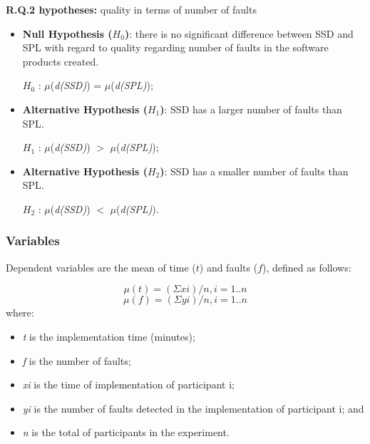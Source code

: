 \textbf{R.Q.2 hypotheses:}
quality in terms of number of faults
	\begin{itemize}
	
	\item \textbf{Null Hypothesis ($H_{0}$)}: there is no significant difference between SSD and SPL with regard to quality regarding number of faults in the software products created.
	
	$H_{0}$ : $\mu$(\textit{d(SSD)}) =  $\mu$(\textit{d(SPL)});
	
	\item \textbf{Alternative Hypothesis ($H_{1}$)}: SSD has a larger number of faults than SPL.
	
	$H_{1}$ : $\mu$(\textit{d(SSD)}) $>$ $\mu$(\textit{d(SPL)});
		
	\item \textbf{Alternative Hypothesis ($H_{2}$)}: SSD has a smaller number of faults than SPL.
	
	$H_{2}$ :  $\mu$(\textit{d(SSD)}) $<$ $\mu$(\textit{d(SPL)}).		
	
	\end{itemize}

\subsubsection{Variables}

Dependent variables are the mean of time ($t$) and faults ($f$), defined as follows:

\small

\begin{equation}\label{eq:1}
\mu{(t)}=(\Sigma xi)/n, i = 1..n
\end{equation}
\begin{equation}\label{eq:2}
\mu{(f)}=(\Sigma yi)/n, i = 1..n
\end{equation}
\normalsize 
where:
\begin{itemize}
\item \textit{t} is the implementation time (minutes);
\item \textit{f} is the number of faults;
\item \textit{xi} is the time of implementation of participant i;
\item \textit{yi} is the number of faults detected in the implementation of participant i; and
\item \textit{n} is the total of participants in the experiment.
\end{itemize}
\normalsize

